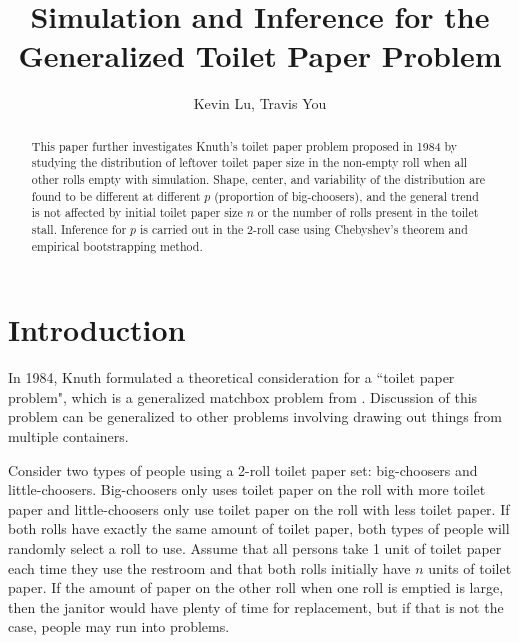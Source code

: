 \documentclass{article}
\author{Kevin Lu, Travis You}
\title{Simulation and Inference for the Generalized Toilet Paper Problem}
\begin{document}
\maketitle
\begin{abstract}
This paper further investigates Knuth's toilet paper problem proposed in 1984 by studying the distribution of leftover toilet paper size in the non-empty roll when all other rolls empty with simulation. Shape, center, and variability of the distribution are found to be different at different $p$ (proportion of big-choosers), and the general trend is not affected by initial toilet paper size $n$ or the number of rolls present in the toilet stall. Inference for $p$ is carried out in the 2-roll case using Chebyshev's theorem and empirical bootstrapping method.
\end{abstract}
\section{Introduction}
In 1984, Knuth formulated a theoretical consideration for a ``toilet paper problem"\cite{Knuth1984}, which is a generalized matchbox problem from \cite{Feller}. Discussion of this problem can be generalized to other problems involving drawing out things from multiple containers.

Consider two types of people using a 2-roll toilet paper set: big-choosers and little-choosers. Big-choosers only uses toilet paper on the roll with more toilet paper and little-choosers only use toilet paper on the roll with less toilet paper. If both rolls have exactly the same amount of toilet paper, both types of people will randomly select a roll to use. Assume that all persons take 1 unit of toilet paper each time they use the restroom and that both rolls initially have $n$ units of toilet paper. If the amount of paper on the other roll when one roll is emptied is large, then the janitor would have plenty of time for replacement, but if that is not the case, people may run into problems.
\end{document}
